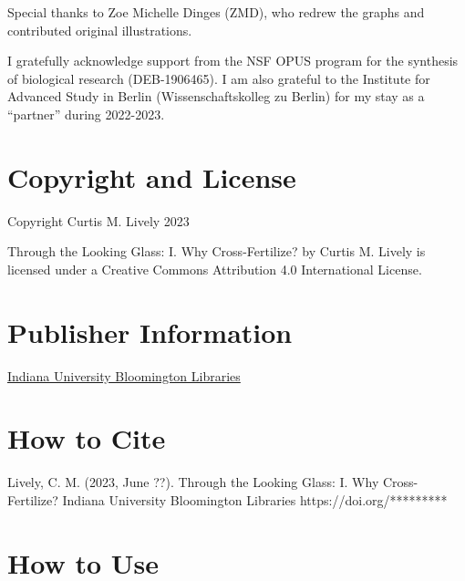 \documentclass[
  letterpaper,
]{scrbook}
\begin{document}
Special thanks to Zoe Michelle Dinges (ZMD), who redrew the graphs and
contributed original illustrations.

I gratefully acknowledge support from the NSF OPUS program for the
synthesis of biological research (DEB-1906465). I am also grateful to
the Institute for Advanced Study in Berlin (Wissenschaftskolleg zu
Berlin) for my stay as a ``partner'' during 2022-2023.

\hypertarget{copyright-and-license}{%
\section*{Copyright and License}\label{copyright-and-license}}


Copyright Curtis M. Lively 2023

{Through the Looking Glass: I. Why Cross-Fertilize?} by Curtis M. Lively
is licensed under a Creative Commons Attribution 4.0 International
License.

\hypertarget{publisher-information}{%
\section*{Publisher Information}\label{publisher-information}}


\href{https://libraries.indiana.edu/}{Indiana University Bloomington
Libraries}

\hypertarget{how-to-cite}{%
\section*{How to Cite}\label{how-to-cite}}


Lively, C. M. (2023, June ??). Through the Looking Glass: I. Why
Cross-Fertilize? Indiana University Bloomington Libraries
https://doi.org/*********

\hypertarget{how-to-use}{%
\section*{How to Use}\label{how-to-use}}

\end{document}
